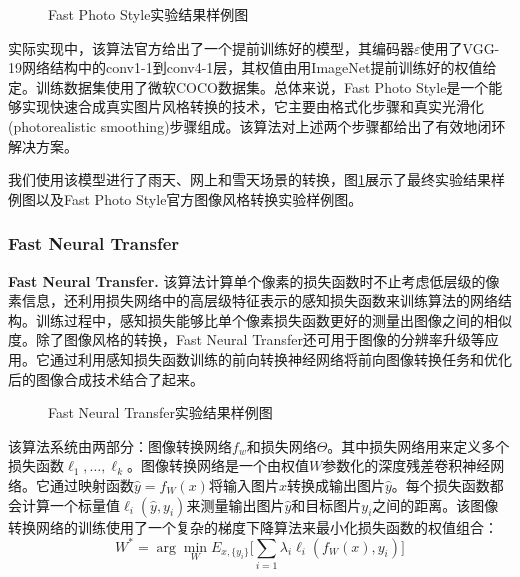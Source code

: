 \begin{figure}[t]
    \centering
    \caption{Fast Photo Style实验结果样例图}
    \label{fps-result}
\end{figure}

实际实现中，该算法官方给出了一个提前训练好的模型，其编码器$\varepsilon$使用了VGG-19网络结构中的conv1-1到conv4-1层，其权值由用ImageNet提前训练好的权值给定。训练数据集使用了微软COCO数据集\cite{coco}。总体来说，Fast Photo Style是一个能够实现快速合成真实图片风格转换的技术，它主要由格式化步骤和真实光滑化(photorealistic smoothing)步骤组成。该算法对上述两个步骤都给出了有效地闭环解决方案。

我们使用该模型进行了雨天、网上和雪天场景的转换，图\ref{fps-result}展示了最终实验结果样例图以及Fast Photo Style官方图像风格转换实验样例图。


\subsubsection{Fast Neural Transfer}

\textbf{Fast Neural Transfer.}\cite{FNT} 该算法计算单个像素的损失函数时不止考虑低层级的像素信息，还利用损失网络中的高层级特征表示的感知损失函数来训练算法的网络结构。训练过程中，感知损失能够比单个像素损失函数更好的测量出图像之间的相似度。除了图像风格的转换，Fast Neural Transfer还可用于图像的分辨率升级等应用。它通过利用感知损失函数训练的前向转换神经网络将前向图像转换任务和优化后的图像合成技术结合了起来。

\begin{figure}[!bh]
    \centering
    \caption{Fast Neural Transfer实验结果样例图}
    \label{fnt-result}
\end{figure}

该算法系统由两部分：图像转换网络$f_w$和损失网络$\Theta$。其中损失网络用来定义多个损失函数$\ell_1,\dots,\ell_k$。图像转换网络是一个由权值$W$参数化的深度残差卷积神经网络。它通过映射函数$\hat{y}=f_W(x)$将输入图片$x$转换成输出图片$\hat{y}$。每个损失函数都会计算一个标量值$\ell_i(\hat{y},y_i)$来测量输出图片$\hat{y}$和目标图片$y_i$之间的距离。该图像转换网络的训练使用了一个复杂的梯度下降算法来最小化损失函数的权值组合：
$$W^*=\arg \min_W E_{x,\{y_i\}}\Big[\sum_{i=1}\lambda_i\ell_i(f_W(x),y_i)\Big]$$

